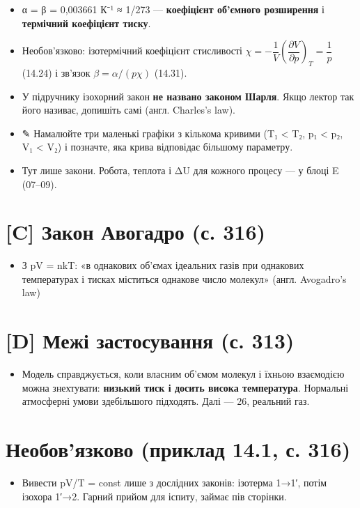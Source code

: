 \documentclass[11pt,a4paper,oneside]{book}
\newcommand{\pen}{{\sffamily\color{accent}✎}}
\begin{document}
\begin{itemize}
\item α = β = 0,003661 К⁻¹ ≈ 1/273 — \textbf{коефіцієнт об'ємного розширення} і \textbf{термічний коефіцієнт тиску}.
\item Необов'язково: ізотермічний коефіцієнт стисливості $\chi = -\dfrac1V\left(\dfrac{\partial V}{\partial p}\right)_T = \dfrac1p$ (14.24) і зв'язок $\beta = \alpha/(p\chi)$ (14.31).
\item У підручнику ізохорний закон \textbf{не названо законом Шарля}. Якщо лектор так його називає, допишіть самі (англ. Charles's law).
\item \pen{} Намалюйте три маленькі графіки з кількома кривими (T₁ < T₂, p₁ < p₂, V₁ < V₂) і позначте, яка крива відповідає більшому параметру.
\item Тут лише закони. Робота, теплота і ΔU для кожного процесу — у блоці E (07–09).
\end{itemize}

\section*{[C] Закон Авогадро (с. 316)}
\begin{itemize}
\item З pV = nkT: «в однакових об'ємах ідеальних газів при однакових температурах і тисках міститься однакове число молекул» (англ. Avogadro's law)
\end{itemize}

\section*{[D] Межі застосування (с. 313)}
\begin{itemize}
\item Модель справджується, коли власним об'ємом молекул і їхньою взаємодією можна знехтувати: \textbf{низький тиск і досить висока температура}. Нормальні атмосферні умови здебільшого підходять. Далі — 26, реальний газ.
\end{itemize}

\section*{Необов'язково (приклад 14.1, с. 316)}
\begin{itemize}
\item Вивести pV/T = const лише з дослідних законів: ізотерма 1→1′, потім ізохора 1′→2. Гарний прийом для іспиту, займає пів сторінки.
\end{itemize}
\end{document}
